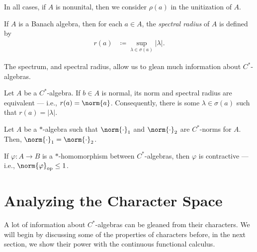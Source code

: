 \begin{remark}
  In all cases, if $A$ is nonunital, then we consider $\rho\left( a \right)$ in the unitization of $A$.
\end{remark}
\begin{definition}{\cite[Definition 7.3.5]{rainone_analysis}}
  If $A$ is a Banach algebra, then for each $a\in A$, the \textit{spectral radius} of $A$ is defined by
  \begin{align*}
    r(a) &\coloneq \sup_{\lambda\in \sigma\left( a \right)}\left\vert \lambda \right\vert.
  \end{align*}
\end{definition}
The spectrum, and spectral radius, allow us to glean much information about $C^{\ast}$-algebras.
\begin{proposition}
  Let $A$ be a $C^{\ast}$-algebra. If $b\in A$ is normal, its norm and spectral radius are equivalent --- i.e., $r(a) =\norm{a} $. Consequently, there is some $\lambda\in \sigma\left( a \right)$ such that $r(a) = \left\vert \lambda \right\vert$.
\end{proposition}
\begin{proposition}
  Let $A$ be a ${\ast}$-algebra such that $\norm{\cdot}_1$ and $\norm{\cdot}_2$ are $C^{\ast}$-norms for $A$. Then, $\norm{\cdot}_1 = \norm{\cdot}_2$.
\end{proposition}
\begin{proposition}
  If $\varphi\colon A\rightarrow B$ is a $\ast$-homomorphism between $C^{\ast}$-algebras, then $\varphi$ is contractive --- i.e., $\norm{\varphi}_{\op}\leq 1$.
\end{proposition}
\section{Analyzing the Character Space}%
A lot of information about $C^{\ast}$-algebras can be gleaned from their characters. We will begin by discussing some of the properties of characters before, in the next section, we show their power with the continuous functional calculus.\newline

